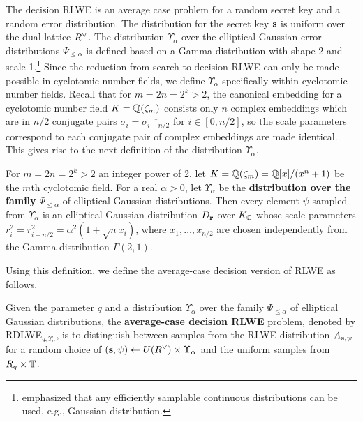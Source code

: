 \documentclass[../main.tex]{subfiles}
\begin{document}
The decision RLWE is an average case problem for a random secret key and a random error distribution. The distribution for the secret key $\mathbf{s}$ is uniform over the dual lattice $R^{\vee}$. The distribution $\Upsilon_{\alpha}$ over the elliptical Gaussian error distributions $\Psi_{\le \alpha}$ is defined based on a Gamma distribution with shape 2 and scale 1.\footnote{\cite{lyubashevsky2010ideal} emphasized that any efficiently samplable continuous distributions can be used, e.g., Gaussian distribution.} Since the reduction from search to decision RLWE can only be made possible in cyclotomic number fields, we define $\Upsilon_{\alpha}$ specifically within cyclotomic number fields. Recall that for $m=2n=2^k > 2$, the canonical embedding for a cyclotomic number field $K=\mathbb{Q}(\zeta_m)$ consists only $n$ complex embeddings which are in $n/2$ conjugate pairs $\sigma_i=\overline{\sigma_{i+n/2}}$ for $i \in [0,n/2]$, so the scale parameters correspond to each conjugate pair of complex embeddings are made identical. This gives rise to the next definition of the distribution $\Upsilon_{\alpha}$. 

\begin{definition}
For $m=2n=2^k > 2$ an integer power of 2, let $K=\mathbb{Q}(\zeta_m)=\mathbb{Q}[x]/(x^n+1)$ be the $m$th cyclotomic field. For a real $\alpha>0$, let $\Upsilon_{\alpha}$ be the \textbf{distribution over the family} $\Psi_{\le \alpha}$ of elliptical Gaussian distributions. Then every element $\psi$ sampled from $\Upsilon_{\alpha}$ is an elliptical Gaussian distribution $D_{\mathbf{r}}$ over $K_{\mathbb{C}}$ whose scale parameters $r_i^2 = r_{i+n/2}^2=\alpha^2(1+\sqrt{n} x_i)$, where $x_1, \dots, x_{n/2}$ are chosen independently from the Gamma distribution $\Gamma(2,1)$.
\end{definition}

Using this definition, we define the average-case decision version of RLWE as follows. 

\begin{definition}
\reversemarginpar
{}
Given the parameter $q$ and a distribution $\Upsilon_{\alpha}$ over the family $\Psi_{\le \alpha}$ of elliptical Gaussian distributions, the \textbf{average-case decision RLWE} problem, denoted by RDLWE$_{q, \Upsilon_{\alpha}}$, is to distinguish between samples from the RLWE distribution $A_{\mathbf{s},\psi}$ for a random choice of $(\mathbf{s},\psi) \leftarrow U(R^{\vee}) \times \Upsilon_{\alpha}$ and the uniform samples from $R_q \times \mathbb{T}$.
\end{definition}
\end{document}
